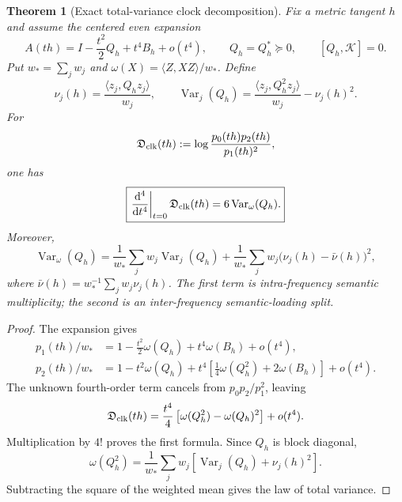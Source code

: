 \documentclass[11pt]{article}
\newtheorem{theorem}{Theorem}[section]
\theoremstyle{definition}
\theoremstyle{remark}
\newcommand{\dd}{\mathrm d}
\begin{document}
\begin{theorem}[Exact total-variance clock decomposition]
\label{thm:semantic-total-variance-master}
Fix a metric tangent $h$ and assume the centered even expansion
\begin{equation}
  A(th)=I-\frac{t^2}{2}Q_h+t^4B_h+o(t^4),
  \qquad Q_h=Q_h^*\succeq0,
  \qquad [Q_h,\mathscr K]=0.
  \label{eq:semantic-score-expansion-master}
\end{equation}
Put $w_*=\sum_jw_j$ and
$\omega(X)=\langle Z,XZ\rangle/w_*$.  Define
\[
  \nu_j(h)=\frac{\langle z_j,Q_hz_j\rangle}{w_j},
  \qquad
  \operatorname{Var}_j(Q_h)
  =\frac{\langle z_j,Q_h^2z_j\rangle}{w_j}-\nu_j(h)^2.
\]
For
\begin{equation}
  \mathfrak D_{\rm clk}(th)
  :=\log\frac{p_0(th)p_2(th)}{p_1(th)^2},
  \label{eq:semantic-clock-defect-master}
\end{equation}
one has
\begin{equation}
  \boxed{
  \left.\frac{\dd^4}{\dd t^4}\right|_{t=0}
  \mathfrak D_{\rm clk}(th)
  =6\operatorname{Var}_{\omega}(Q_h).}
  \label{eq:semantic-fourth-variance-master}
\end{equation}
Moreover,
\begin{equation}
  \boxed{
  \operatorname{Var}_{\omega}(Q_h)
  =\frac1{w_*}\sum_jw_j\operatorname{Var}_j(Q_h)
   +\frac1{w_*}\sum_jw_j
    \bigl(\nu_j(h)-\bar\nu(h)\bigr)^2,}
  \label{eq:semantic-total-variance-master}
\end{equation}
where $\bar\nu(h)=w_*^{-1}\sum_jw_j\nu_j(h)$.  The first term is
intra-frequency semantic multiplicity; the second is an inter-frequency
semantic-loading split.
\end{theorem}

\begin{proof}
The expansion gives
\begin{align*}
  p_1(th)/w_*
  &=1-\frac{t^2}{2}\omega(Q_h)+t^4\omega(B_h)+o(t^4),\\
  p_2(th)/w_*
  &=1-t^2\omega(Q_h)
    +t^4\left[\frac14\omega(Q_h^2)+2\omega(B_h)\right]+o(t^4).
\end{align*}
The unknown fourth-order term cancels from $p_0p_2/p_1^2$, leaving
\[
  \mathfrak D_{\rm clk}(th)
  =\frac{t^4}{4}
   \left[\omega(Q_h^2)-\omega(Q_h)^2\right]+o(t^4).
\]
Multiplication by $4!$ proves the first formula.  Since $Q_h$ is block
diagonal,
\[
  \omega(Q_h^2)
  =\frac1{w_*}\sum_jw_j
   \left[\operatorname{Var}_j(Q_h)+\nu_j(h)^2\right].
\]
Subtracting the square of the weighted mean gives the law of total variance.
\end{proof}
\end{document}
